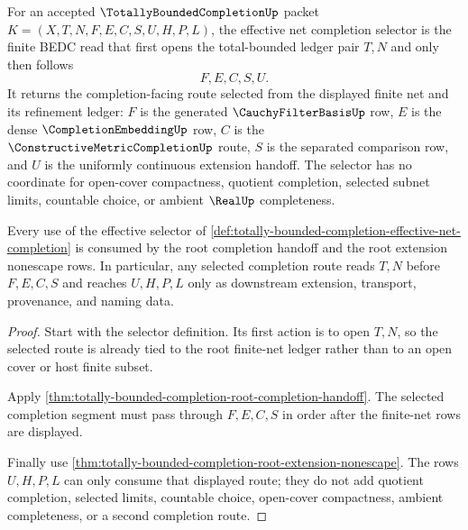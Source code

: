 \begin{definition}
\label{def:totally-bounded-completion-effective-net-completion}
For an accepted $\TotallyBoundedCompletionUp$ packet $K=(X,T,N,F,E,C,S,U,H,P,L)$, the effective net completion selector is the finite BEDC read that first opens the total-bounded ledger pair $T,N$ and only then follows
$$
F,E,C,S,U .
$$
It returns the completion-facing route selected from the displayed finite net and its refinement ledger: $F$ is the generated $\CauchyFilterBasisUp$ row, $E$ is the dense $\CompletionEmbeddingUp$ row, $C$ is the $\ConstructiveMetricCompletionUp$ route, $S$ is the separated comparison row, and $U$ is the uniformly continuous extension handoff. The selector has no coordinate for open-cover compactness, quotient completion, selected subnet limits, countable choice, or ambient $\RealUp$ completeness.
\end{definition}

\begin{theorem}
\label{thm:totally-bounded-completion-effective-net-completion-consumption}
Every use of the effective selector of \autoref{def:totally-bounded-completion-effective-net-completion} is consumed by the root completion handoff and the root extension nonescape rows. In particular, any selected completion route reads $T,N$ before $F,E,C,S$ and reaches $U,H,P,L$ only as downstream extension, transport, provenance, and naming data.
\end{theorem}
\begin{proof}
Start with the selector definition. Its first action is to open $T,N$, so the selected route is already tied to the root finite-net ledger rather than to an open cover or host finite subset.

Apply \autoref{thm:totally-bounded-completion-root-completion-handoff}. The selected completion segment must pass through $F,E,C,S$ in order after the finite-net rows are displayed.

Finally use \autoref{thm:totally-bounded-completion-root-extension-nonescape}. The rows $U,H,P,L$ can only consume that displayed route; they do not add quotient completion, selected limits, countable choice, open-cover compactness, ambient completeness, or a second completion route.
\end{proof}

